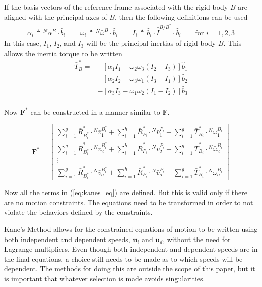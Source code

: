 \documentclass[smallcondensed,final]{svjour3}                     %
\begin{document}
If the basis vectors of the reference frame associated with the rigid body $B$
are aligned with the principal axes of $B$, then the following definitions can
be used
\begin{align}
\alpha_i \triangleq {^N}\bar{\alpha}^B \cdot \hat{b}_i \quad \quad
\omega_i \triangleq {^N}\bar{\omega}^B \cdot \hat{b}_i \quad \quad
I_i \triangleq \hat{b}_i \cdot \bar{\bar{I}}^{B/B^*} \cdot \hat{b}_i
\quad \quad \text{for }i=1,2,3
\end{align}
In this case, $I_1$, $I_2$, and $I_3$ will be the principal inertias of rigid
body $B$.
This allows the inertia torque to be written
\begin{align}
\label{eq:simple_rb_rotational_gen_inertia}
\bar{T}_B^* =& -[\alpha_1 I_1 - \omega_2 \omega_3 (I_2 - I_3)] \hat{b}_1\\
             & -[\alpha_2 I_2 - \omega_3 \omega_1 (I_3 - I_1)] \hat{b}_2\\
             & -[\alpha_3 I_3 - \omega_1 \omega_2 (I_1 - I_2)] \hat{b}_3\\
\end{align}

Now $\mathbf{F}^*$ can be constructed in a manner similar to $\mathbf{F}$.

\begin{equation}
\label{eq:definition_Fstar}
\mathbf{F}^* =
\begin{bmatrix}
\displaystyle \sum_{i=1}^g \bar{R}^*_{B^*_i} \cdot {^N}\bar{v}^{B^*_i}_1 +
\sum_{i=1}^h \bar{R}^*_{P_i} \cdot {^N}\bar{v}^{P_i}_1 +
\sum_{i=1}^g \bar{T}^*_{B_i} \cdot {^N}\bar{\omega}^{B_i}_1 \\
\displaystyle \sum_{i=1}^g \bar{R}^*_{B^*_i} \cdot {^N}\bar{v}^{B^*_i}_2 +
\sum_{i=1}^h \bar{R}^*_{P_i} \cdot {^N}\bar{v}^{P_i}_2 +
\sum_{i=1}^g \bar{T}^*_{B_i} \cdot {^N}\bar{\omega}^{B_i}_2 \\
\displaystyle \vdots \\
\displaystyle \sum_{i=1}^g \bar{R}^*_{B^*_i} \cdot {^N}\bar{v}^{B^*_i}_o +
\sum_{i=1}^h \bar{R}^*_{P_i} \cdot {^N}\bar{v}^{P_i}_o +
\sum_{i=1}^g \bar{T}^*_{B_i} \cdot {^N}\bar{\omega}^{B_i}_o
\end{bmatrix}
\end{equation}

Now all the terms in (\ref{eq:kanes_eq}) are defined.
But this is valid only if there are no motion constraints.
The equations need to be transformed in order to not violate the behaviors
defined by the constraints.

Kane's Method allows for the constrained equations of motion to be written
using both independent and dependent speeds, $\mathbf{u}_i$ and $\mathbf{u}_d$,
without the need for Lagrange multipliers.
Even though both independent and dependent speeds are in the final equations, a
choice still needs to be made as to which speeds will be dependent.
The methods for doing this are outside the scope of this paper, but it is
important that whatever selection is made avoids singularities.
\end{document}
